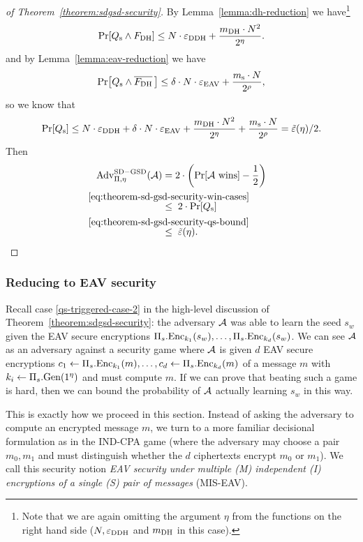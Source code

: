 \begin{proof}[of Theorem~\ref{theorem:sdgsd-security}]
	By Lemma~\vref{lemma:dh-reduction} we have\footnote{Note that we are again omitting the argument $\eta$ from the functions on the right hand side ($N, \varepsilon_\mathrm{DDH}$ and $m_\mathrm{DH}$ in this case).}
	\[
		\pr{\qs \land \fdh} \le N \cdot \eddh + \frac{\mdh \cdot N^2}{2^\eta}.
	\]
	and by Lemma~\vref{lemma:eav-reduction} we have
	\[
		\pr{\qs \land \overline{\fdh}\,} \le \delta \cdot N \cdot \eeav + \frac{\ms \cdot N}{2^\rho},
	\]
	so we know that
	\begin{equation} \label{eq:theorem-sd-gsd-security-qs-bound}
		\pr{\qs} \le N \cdot \eddh + \delta \cdot N \cdot \eeav + \frac{\mdh \cdot N^2}{2^\eta} + \frac{\ms \cdot N}{2^\rho} = \tilde{\epsilon}(\eta) / 2.
	\end{equation}
	Then
	\begin{align*}
		\advantage{\Pi}{\eta}{SD-GSD}(\adv) & = 2 \cdot \left(\pr{\wins} - \frac{1}{2}\right)                                                   \\
		                                    & \stackrel{\mathclap{\eqref{eq:theorem-sd-gsd-security-win-cases}}}{\le} \;  2 \cdot \pr{\qs}      \\
		                                    & \stackrel{\mathclap{\eqref{eq:theorem-sd-gsd-security-qs-bound}}}{\le} \; \tilde{\epsilon}(\eta).
	\end{align*}
\end{proof}

\subsubsection{Reducing to EAV security}

Recall case \ref{qs-triggered-case-2} in the high-level discussion of Theorem~\ref{theorem:sdgsd-security}: the adversary $\mathcal{A}$ was able to learn the seed $s_w$ given the EAV secure encryptions $\Pi_s.\mathrm{Enc}_{k_1}(s_w), \ldots, \Pi_s.\mathrm{Enc}_{k_d}(s_w)$. We can see $\mathcal{A}$ as an adversary against a security game where $\mathcal{A}$ is given $d$ EAV secure encryptions $c_1 \leftarrow \Pi_s.\mathrm{Enc}_{k_1}(m), \ldots, c_d \leftarrow \Pi_s.\mathrm{Enc}_{k_d}(m)$ of a message $m$ with $k_i \leftarrow \Pi_s.\mathrm{Gen}(1^\eta)$ and must compute $m$. If we can prove that beating such a game is hard, then we can bound the probability of $\mathcal{A}$ actually learning $s_w$ in this way.

This is exactly how we proceed in this section. Instead of asking the adversary to compute an encrypted message $m$, we turn to a more familiar decisional formulation as in the IND-CPA game (where the adversary may choose a pair $m_0, m_1$ and must distinguish whether the $d$ ciphertexts encrypt $m_0$ or $m_1$). We call this security notion \emph{EAV security under multiple (M) independent (I) encryptions of a single (S) pair of messages} (MIS-EAV).

